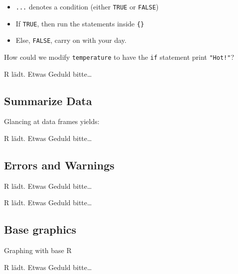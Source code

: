 \documentclass[
  letterpaper,
  DIV=11,
  oneside]{scrreprt}
\providecommand{\tightlist}{%
  \setlength{\itemsep}{0pt}\setlength{\parskip}{0pt}}\usepackage{longtable,booktabs,array}
\begin{document}
\begin{itemize}
\tightlist
\item
  \texttt{...} denotes a condition (either \texttt{TRUE} or
  \texttt{FALSE})
\item
  If \texttt{TRUE}, then run the statements inside \texttt{\{\}}
\item
  Else, \texttt{FALSE}, carry on with your day.
\end{itemize}

How could we modify \texttt{temperature} to have the \texttt{if}
statement print \texttt{"Hot!"}?

R lädt. Etwas Geduld bitte\ldots{}

\hypertarget{webr-editor-4}{}

\hypertarget{webr-code-output-4}{}

\hypertarget{summarize-data}{%
\subsection{Summarize Data}\label{summarize-data}}

Glancing at data frames yields:

R lädt. Etwas Geduld bitte\ldots{}

\hypertarget{webr-editor-5}{}

\hypertarget{webr-code-output-5}{}

\hypertarget{errors-and-warnings}{%
\subsection{Errors and Warnings}\label{errors-and-warnings}}

R lädt. Etwas Geduld bitte\ldots{}

\hypertarget{webr-editor-6}{}

\hypertarget{webr-code-output-6}{}

R lädt. Etwas Geduld bitte\ldots{}

\hypertarget{webr-editor-7}{}

\hypertarget{webr-code-output-7}{}

\hypertarget{base-graphics}{%
\subsection{Base graphics}\label{base-graphics}}

Graphing with base R

R lädt. Etwas Geduld bitte\ldots{}

\hypertarget{webr-editor-8}{}
\end{document}
